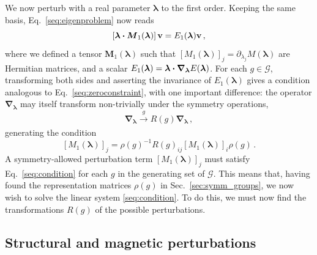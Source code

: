 We now perturb with a real parameter $\boldsymbol{\lambda}$ to the first order. Keeping the same basis, Eq.~\eqref{seq:eigenproblem} now reads
\begin{equation} \label{seq:perteq}
\left[\boldsymbol{\lambda} \vdot \boldsymbol{M}_{1}(\boldsymbol{\lambda})\right] \vb{v} = E_1(\boldsymbol{\lambda}) \vb{v}\,,
\end{equation}
where we defined a tensor $\boldsymbol{M}_{1}(\boldsymbol{\lambda})$ such that $\left[M_1(\boldsymbol{\lambda})\right]_j = \partial_{\lambda_j} M(\boldsymbol{\lambda} )$ are Hermitian matrices, and a scalar $E_{1}(\boldsymbol{\lambda}) = \boldsymbol{\lambda} \vdot \boldsymbol{\nabla_\lambda} E(\boldsymbol{\lambda} )$. 
For each $g \in \mathcal{G}$, transforming both sides and asserting the invariance of $E_1(\boldsymbol{\lambda})$ gives a condition analogous to Eq.~\eqref{seq:zeroconstraint}, with one important difference: the operator $\boldsymbol{\nabla}_{\boldsymbol{\lambda}}$ may itself transform non-trivially under the symmetry operations,
\begin{equation}
\boldsymbol{\nabla}_{\boldsymbol{\lambda}} \xrightarrow[]{g} R(g)   \boldsymbol{\nabla}_{\boldsymbol{\lambda}}\,,
\end{equation}
generating the condition
\begin{equation} \label{seq:condition}
\left[M_1(\boldsymbol{\lambda}) \right]_j =  \rho(g)^{-1} R(g)_{ij} \left[M_1(\boldsymbol{\lambda} )\right]_i \rho(g) \, .
\end{equation}
A symmetry-allowed perturbation term $\left[M_1(\boldsymbol{\lambda}) \right]_j$ must satisfy Eq.~\eqref{seq:condition} for each $g$ in the generating set of $\mathcal{G}$. This means that, having found the representation matrices $\rho(g)$ in Sec.~\ref{sec:symm_groups}, we now wish to solve the linear system \eqref{seq:condition}. To do this, we must now find the transformations $R(g)$ of the possible perturbations. 

\subsection{Structural and magnetic perturbations} \label{sec:symm_eng} 

